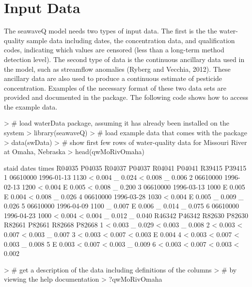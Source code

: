 \documentclass[11pt]{article}
\begin{document}
\section{Input Data}

The seawaveQ model needs two types of input data.  The first is the the water-quality sample data including dates, the concentration data, and qualification codes, indicating which values are censored (less than a long-term method detection level).  The second type of data is the continuous ancillary data used in the model, such as streamflow anomalies (Ryberg and Vecchia, 2012).  These ancillary data are also used to produce a continuous estimate of pesticide concentration.  Examples of the necessary format of these two data sets are provided and documented in the package.  The following code shows how to access the example data.
\vspace{5 mm}

\begin{Schunk}
\begin{Sinput}
> # load waterData package, assuming it has already been installed on the system
> library(seawaveQ)
> # load example data that comes with the package
> data(swData)
> # show first few rows of water-quality data for Missouri River at Omaha, Nebraska
> head(qwMoRivOmaha)
\end{Sinput}
\begin{Soutput}
     staid      dates times R04035 P04035 R04037 P04037 R04041 P04041 R39415 P39415
1 06610000 1996-01-13  1130      <  0.004      _  0.024      <  0.008      _  0.006
2 06610000 1996-02-13  1200      <  0.004      E  0.005      <  0.008      _  0.200
3 06610000 1996-03-13  1000      E  0.005      E  0.004      <  0.008      _  0.026
4 06610000 1996-03-28  1030      <  0.004      E  0.005      _  0.009      _  0.026
5 06610000 1996-04-09  1100      _  0.007      E  0.006      _  0.014      _  0.075
6 06610000 1996-04-23  1000      <  0.004      <  0.004      _  0.012      _  0.040
  R46342 P46342 R82630 P82630 R82661 P82661 R82668 P82668
1      <  0.003      _  0.029      <  0.003      _  0.008
2      <  0.003      <  0.007      <  0.003      _  0.007
3      <  0.003      <  0.007      <  0.003      E  0.004
4      <  0.003      <  0.007      <  0.003      _  0.008
5      E  0.003      <  0.007      <  0.003      _  0.009
6      <  0.003      <  0.007      <  0.003      <  0.002
\end{Soutput}
\begin{Sinput}
> # get a description of the data including definitions of the columns
> # by viewing the help documentation
> ?qwMoRivOmaha
\end{Sinput}
\end{Schunk}
\end{document}
